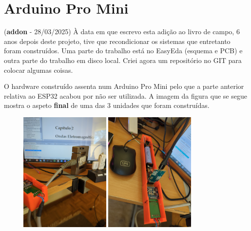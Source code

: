 \documentclass{article}
\begin{document}
\section{Arduino Pro Mini}
(\textbf{addon} - 28/03/2025)
 À data em que escrevo esta adição ao livro de campo, 6 anos depois deste projeto, tive que recondicionar os sistemas que entretanto foram construídos. Uma parte do trabalho está no EasyEda (esquema e PCB) e outra parte do trabalho em disco local. Criei agora um repositório no GIT para colocar algumas coisas.

O hardware construído assenta num Arduino Pro Mini pelo que a parte anterior relativa ao ESP32 acabou por não ser utilizada. A imagem da figura que se segue mostra o aspeto \textbf{final} de uma das 3 unidades que foram construídas.
\begin{figure}[htb!]
\centering
\includegraphics[width=0.4\textwidth]{Figuras/Fig28.png}
\includegraphics[width=0.4\textwidth]{Figuras/Fig29.png}
\label{fig:fig28}
\end{figure}
\end{document}

